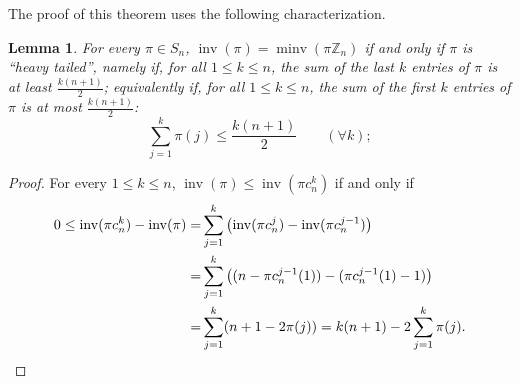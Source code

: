 \documentclass[11pt]{amsart}
\newtheorem{lemma}[theorem]{Lemma}
\numberwithin{equation}{section}
\newcommand{\ZZ}{{\mathbb {Z}}}
\newcommand{\inv}{{\operatorname{inv}}}
\newcommand{\minv}{{\operatorname{minv}}}
\newcommand{\D}{{\operatorname{Diameter}}}
\newcommand{\Sort}{{\operatorname{Sort}}}
\begin{document}

The proof of this theorem uses the following characterization.

\begin{lemma}\label{lem:lower1}
    For every $\pi\in S_n$, $\inv(\pi)=\minv(\pi\ZZ_n)$ if and only if $\pi$ is ``heavy tailed'', namely if, for all $1\le k\le n$, the sum of the last $k$ entries of $\pi$ is at least $\frac{k(n+1)}{2}$;
    equivalently if, for all $1\le k\le n$, the sum of the first $k$ entries of $\pi$ is at most $\frac{k(n+1)}{2}$:
    \[
        \sum_{j=1}^{k} \pi(j) \le \frac{k(n+1)}{2}
        \qquad (\forall k);
   \]
\end{lemma}

\begin{proof} 
    For every $1\le k\le n$, $\inv(\pi)\le \inv(\pi c_n^k)$ if and only if 
    \begin{align*}
        0 \le \inv(\pi c_n^k) - \inv(\pi) 
        =& \sum_{j=1}^{k} \left( \inv(\pi c_n^j) - \inv(\pi c_n^{j-1}) \right) \\
        =& \sum_{j=1}^k \left( (n - \pi c_n^{j-1}(1)) - (\pi c_n^{j-1}(1) - 1) \right) \\
        =& \sum_{j=1}^k (n+1-2\pi(j))
        = k(n+1) - 2\sum_{j=1}^k \pi(j). 
        \qedhere
    \end{align*}
\end{proof}
\end{document}
